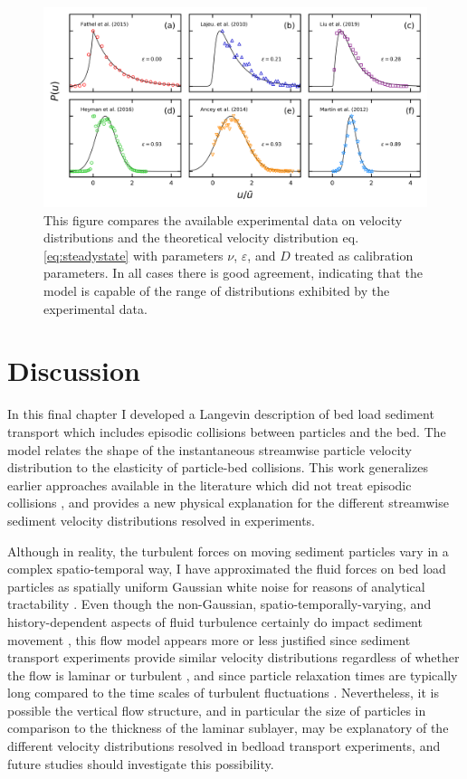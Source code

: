 \begin{figure}
	\centerline{\includegraphics{./figures/ch5/Fig4expComparison.png}}
	\caption{This figure compares the available experimental data on velocity distributions and the theoretical velocity distribution eq. \ref{eq:steadystate} with parameters $\nu$, $\varepsilon$, and $D$ treated as calibration parameters. In all cases there is good agreement, indicating that the model is capable of the range of distributions exhibited by the experimental data.} \label{fig:fig4ch5}
\end{figure}


\section{Discussion}
\label{sec:langdiscussion}

In this final chapter I developed a Langevin description of bed load sediment transport which includes episodic collisions between particles and the bed.
The model relates the shape of the instantaneous streamwise particle velocity distribution to the elasticity of particle-bed collisions.
This work generalizes earlier approaches available in the literature which did not treat episodic collisions \citep{Ancey2014,Fan2014}, and provides a new physical explanation for the different streamwise sediment velocity distributions resolved in experiments.

Although in reality, the turbulent forces on moving sediment particles vary in a complex spatio-temporal way, I have approximated the fluid forces on bed load particles as spatially uniform Gaussian white noise for reasons of analytical tractability \cite[e.g.][]{Michaelides1997}. Even though the non-Gaussian, spatio-temporally-varying, and history-dependent aspects of fluid turbulence certainly do impact sediment movement \citep{Cameron2020,Celik2014}, this flow model appears more or less justified since sediment transport experiments provide similar velocity distributions regardless of whether the flow is laminar or turbulent \citep{Lajeunesse2010, Charru2004}, and since particle relaxation times are typically long compared to the time scales of turbulent fluctuations \citep{Hofland2006,Schmeeckle2007,Nakagawa1981}.
Nevertheless, it is possible the vertical flow structure, and in particular the size of particles in comparison to the thickness of the laminar sublayer, may be explanatory of the different velocity distributions resolved in bedload transport experiments, and future studies should investigate this possibility.

